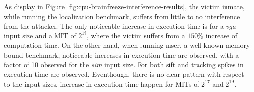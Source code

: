     As display in Figure \ref{fig:cpu-brainfreeze-interference-results}, the victim inmate, while running the localization benchmark, suffers from little to no interference from the attacker. The only noticeable increase in execution time is for a \emph{vga} input size and a MIT of $2^{19}$, where the victim suffers from a $150\%$ increase of computation time.
    On the other hand, when running mser, a well known memory bound benchmark, noticeable increases in execution time are observed, with a factor of 10 observed for the \emph{sim} input size.
    For both sift and tracking spikes in execution time are observed. Eventhough, there is no clear pattern with respect to the input sizes, increase in execution time happen for MITs of $2^{17}$ and $2^{19}$.
